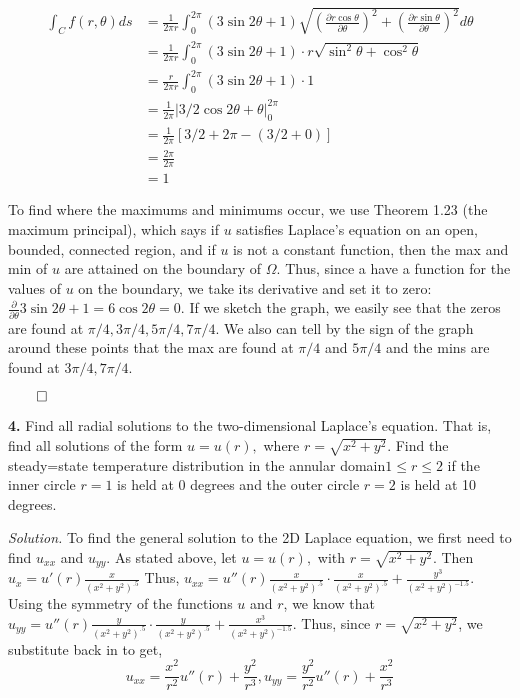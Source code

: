 \documentclass{article}
\begin{document}
\begin{align*}
\int_C f(r,\theta) ds &=\frac{1}{2\pi r} \int_0^{2\pi} (3 \sin 2\theta  +1)\sqrt{\left( \frac{\partial r \cos \theta}{\partial \theta}\right)^2 + \left(\frac{\partial r \sin \theta}{\partial \theta}\right)^2} d\theta \\
&=\frac{1}{2\pi r} \int_0^{2\pi} (3 \sin 2\theta  +1)\cdot r \sqrt{ \sin^2 \theta + \cos^2 \theta } \\
&=\frac{r}{2\pi r} \int_0^{2\pi} (3 \sin 2\theta  +1) \cdot 1 \\
&= \frac{1}{2\pi}   | 3/2 \cos 2\theta + \theta |_0^{2\pi} \\
&= \frac{1}{2\pi} \left[3/2+2\pi - ( 3/2 +0)   \right] \\
&= \frac{2\pi}{ 2\pi}\\
&= 1
\end{align*}

To find where the maximums  and minimums occur, we use Theorem 1.23 (the maximum principal), which says if \(u\) satisfies Laplace's equation on an open, bounded, connected region, and if \(u\) is not a constant function, then the max and min of \(u\) are attained on the boundary of \(\Omega\). Thus, since a have a function for the values of \(u\) on the boundary, we take its derivative and set it to zero:\( \frac{\partial}{\partial \theta} 3\sin 2\theta +1= 6 \cos 2 \theta = 0\). If we sketch the graph, we easily see that the zeros are found at \( \pi/4, 3\pi/4, 5\pi/4 ,7\pi/4\).  We also can tell by the sign of the graph around these points that the max are found at \( \pi/4\) and \( 5\pi/4 \) and the mins are found at \(3\pi/4,7\pi/4\).  
\begin{flushright}
\( \qed \)
\end{flushright}

\vspace{3mm} 

\textbf{4. } Find all radial solutions to the two-dimensional Laplace's equation. That is, find all solutions of the form \(u= u(r),\) where \( r = \sqrt{x^2 + y^2}. \)  Find the steady=state temperature distribution in the annular domain\( 1\leq r \leq 2\) if the inner circle \(r=1\) is held at 0 degrees and the outer circle \(r=2\) is held at 10 degrees. 

\vspace{3mm}
\textit{Solution.} To find the general solution to the 2D Laplace equation, we first need to find \(u_{xx}\) and \(u_{yy}\). As stated above, let \(u= u(r),\) with \( r = \sqrt{x^2 + y^2} \). Then \(u_x = u'(r) \frac{x}{(x^2 +y^2)^.5} \)
Thus, \(u_{xx} = u''(r) \frac{x}{(x^2 +y^2)^.5} \cdot \frac{x}{(x^2 +y^2)^.5} + \frac{y^3}{ (x^2+y^2)^{-1.5}}  \). Using the symmetry of the functions \(u\) and \(r\), we know that \(u_{yy} = u''(r) \frac{y}{(x^2 +y^2)^.5} \cdot \frac{y}{(x^2 +y^2)^.5} + \frac{x^3}{ (x^2+y^2)^{-1.5}}  \). Thus, since  \( r = \sqrt{x^2 + y^2} \), we substitute back in to get, 
\[
u_{xx}= \frac{x^2}{r^2} u''(r)+ \frac{y^2}{r^3},  u_{yy}= \frac{y^2}{r^2}u''(r) + \frac{x^2}{r^3}
\]
\end{document}
